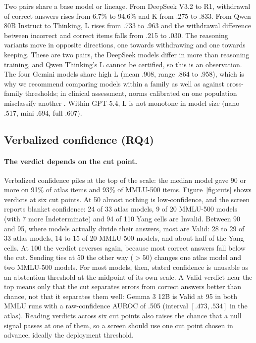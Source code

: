 \documentclass[11pt,a4paper]{article}
\begin{document}
Two pairs share a base model or lineage. From DeepSeek V3.2 to R1, withdrawal of correct answers rises from 6.7\% to 94.6\% and K from .275 to .833. From Qwen 80B Instruct to Thinking, L rises from .733 to .963 and the withdrawal difference between incorrect and correct items falls from .215 to .030. The reasoning variants move in opposite directions, one towards withdrawing and one towards keeping. These are two pairs, the DeepSeek models differ in more than reasoning training, and Qwen Thinking's L cannot be certified, so this is an observation. The four Gemini models share high L (mean .908, range .864 to .958), which is why we recommend comparing models within a family as well as against cross-family thresholds; in clinical assessment, norms calibrated on one population misclassify another \citep{cheung1996,vandevijver2005}. Within GPT-5.4, L is not monotone in model size (nano .517, mini .694, full .607).

\subsection{Verbalized confidence (RQ4)}\label{sec:cross}

\paragraph{The verdict depends on the cut point.} Verbalized confidence piles at the top of the scale: the median model gave 90 or more on 91\% of atlas items and 93\% of MMLU-500 items. Figure~\ref{fig:cuts} shows verdicts at six cut points. At 50 almost nothing is low-confidence, and the screen reports blanket confidence: 24 of 33 atlas models, 9 of 20 MMLU-500 models (with 7 more Indeterminate) and 94 of 110 Yang cells are Invalid. Between 90 and 95, where models actually divide their answers, most are Valid: 28 to 29 of 33 atlas models, 14 to 15 of 20 MMLU-500 models, and about half of the Yang cells. At 100 the verdict reverses again, because most correct answers fall below the cut. Sending ties at 50 the other way ($> 50$) changes one atlas model and two MMLU-500 models. For most models, then, stated confidence is unusable as an abstention threshold at the midpoint of its own scale. A Valid verdict near the top means only that the cut separates errors from correct answers better than chance, not that it separates them well: Gemma 3 12B is Valid at 95 in both MMLU runs with a raw-confidence AUROC of .505 (interval $[.473, .534]$ in the atlas). Reading verdicts across six cut points also raises the chance that a null signal passes at one of them, so a screen should use one cut point chosen in advance, ideally the deployment threshold.
\end{document}
